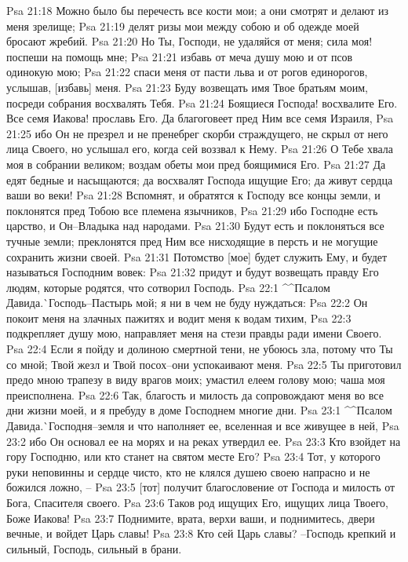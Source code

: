 Psa 21:18  Можно было бы перечесть все кости мои; а они смотрят и делают из меня зрелище;
Psa 21:19  делят ризы мои между собою и об одежде моей бросают жребий.
Psa 21:20  Но Ты, Господи, не удаляйся от меня; сила моя! поспеши на помощь мне;
Psa 21:21  избавь от меча душу мою и от псов одинокую мою;
Psa 21:22  спаси меня от пасти льва и от рогов единорогов, услышав, [избавь] меня.
Psa 21:23  Буду возвещать имя Твое братьям моим, посреди собрания восхвалять Тебя.
Psa 21:24  Боящиеся Господа! восхвалите Его. Все семя Иакова! прославь Его. Да благоговеет пред Ним все семя Израиля,
Psa 21:25  ибо Он не презрел и не пренебрег скорби страждущего, не скрыл от него лица Своего, но услышал его, когда сей воззвал к Нему.
Psa 21:26  О Тебе хвала моя в собрании великом; воздам обеты мои пред боящимися Его.
Psa 21:27  Да едят бедные и насыщаются; да восхвалят Господа ищущие Его; да живут сердца ваши во веки!
Psa 21:28  Вспомнят, и обратятся к Господу все концы земли, и поклонятся пред Тобою все племена язычников,
Psa 21:29  ибо Господне есть царство, и Он--Владыка над народами.
Psa 21:30  Будут есть и поклоняться все тучные земли; преклонятся пред Ним все нисходящие в персть и не могущие сохранить жизни своей.
Psa 21:31  Потомство [мое] будет служить Ему, и будет называться Господним вовек:
Psa 21:32  придут и будут возвещать правду Его людям, которые родятся, что сотворил Господь.
Psa 22:1  ^^Псалом Давида.^^ Господь--Пастырь мой; я ни в чем не буду нуждаться:
Psa 22:2  Он покоит меня на злачных пажитях и водит меня к водам тихим,
Psa 22:3  подкрепляет душу мою, направляет меня на стези правды ради имени Своего.
Psa 22:4  Если я пойду и долиною смертной тени, не убоюсь зла, потому что Ты со мной; Твой жезл и Твой посох--они успокаивают меня.
Psa 22:5  Ты приготовил предо мною трапезу в виду врагов моих; умастил елеем голову мою; чаша моя преисполнена.
Psa 22:6  Так, благость и милость да сопровождают меня во все дни жизни моей, и я пребуду в доме Господнем многие дни.
Psa 23:1  ^^Псалом Давида.^^ Господня--земля и что наполняет ее, вселенная и все живущее в ней,
Psa 23:2  ибо Он основал ее на морях и на реках утвердил ее.
Psa 23:3  Кто взойдет на гору Господню, или кто станет на святом месте Его?
Psa 23:4  Тот, у которого руки неповинны и сердце чисто, кто не клялся душею своею напрасно и не божился ложно, --
Psa 23:5  [тот] получит благословение от Господа и милость от Бога, Спасителя своего.
Psa 23:6  Таков род ищущих Его, ищущих лица Твоего, Боже Иакова!
Psa 23:7  Поднимите, врата, верхи ваши, и поднимитесь, двери вечные, и войдет Царь славы!
Psa 23:8  Кто сей Царь славы? --Господь крепкий и сильный, Господь, сильный в брани.
